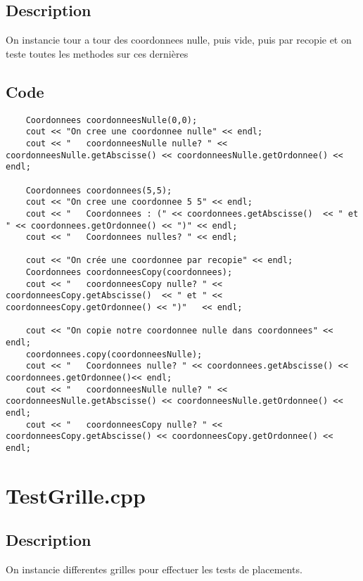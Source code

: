         \subsection{Description}
            On instancie tour a tour des coordonnees nulle, puis vide, puis par recopie et on teste toutes les methodes sur ces dernières
        \subsection{Code}
\begin{lstlisting}
	Coordonnees coordonneesNulle(0,0);
    cout << "On cree une coordonnee nulle" << endl;
    cout << "   coordonneesNulle nulle? " << coordonneesNulle.getAbscisse() << coordonneesNulle.getOrdonnee() << endl;

    Coordonnees coordonnees(5,5);
    cout << "On cree une coordonnee 5 5" << endl;
    cout << "   Coordonnees : (" << coordonnees.getAbscisse()  << " et " << coordonnees.getOrdonnee() << ")" << endl;
    cout << "   Coordonnees nulles? " << endl;

    cout << "On crée une coordonnee par recopie" << endl;
    Coordonnees coordonneesCopy(coordonnees);
    cout << "   coordonneesCopy nulle? " << coordonneesCopy.getAbscisse()  << " et " << coordonneesCopy.getOrdonnee() << ")"   << endl;

    cout << "On copie notre coordonnee nulle dans coordonnees" << endl;
    coordonnees.copy(coordonneesNulle);
    cout << "   Coordonnees nulle? " << coordonnees.getAbscisse() << coordonnees.getOrdonnee()<< endl;
    cout << "   coordonneesNulle nulle? " << coordonneesNulle.getAbscisse() << coordonneesNulle.getOrdonnee() << endl;
    cout << "   coordonneesCopy nulle? " << coordonneesCopy.getAbscisse() << coordonneesCopy.getOrdonnee() << endl;
	\end{lstlisting}
    \section{TestGrille.cpp}
        \subsection{Description}
            On instancie differentes grilles pour effectuer les tests de placements.
